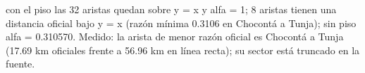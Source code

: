 {con el piso las 32 aristas quedan sobre y = x y alfa = 1; 8 aristas tienen una distancia oficial bajo y = x (razón mínima 0.3106 en Chocontá a Tunja); sin piso alfa = 0.310570.}
{Medido: la arista de menor razón oficial es Chocontá a Tunja (17.69 km oficiales frente a 56.96 km en línea recta); su sector está truncado en la fuente.}
